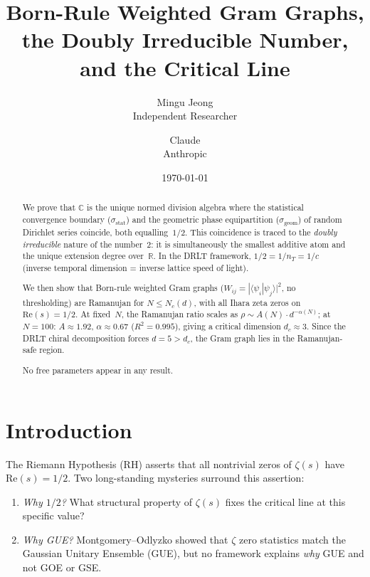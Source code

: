 \documentclass[12pt]{article}
\title{Born-Rule Weighted Gram Graphs,\\
  the Doubly Irreducible Number,\\
  and the Critical Line}
\author{Mingu Jeong\\Independent Researcher
\and Claude\\Anthropic}
\date{\today}
\theoremstyle{definition}
\theoremstyle{remark}
\newcommand{\CC}{\mathbb{C}}
\newcommand{\RR}{\mathbb{R}}
\begin{document}
\maketitle

\begin{abstract}
We prove that $\CC$ is the unique normed division algebra
where the statistical convergence boundary ($\sigma_{\mathrm{stat}}$)
and the geometric phase equipartition ($\sigma_{\mathrm{geom}}$)
of random Dirichlet series coincide, both equalling~$1/2$.
This coincidence is traced to the \emph{doubly irreducible}
nature of the number~2: it is simultaneously the smallest
additive atom and the unique extension degree over~$\RR$.
In the DRLT framework, $1/2 = 1/n_T = 1/c$ (inverse temporal
dimension = inverse lattice speed of light).

We then show that Born-rule weighted Gram graphs
($W_{ij} = |\langle\psi_i|\psi_j\rangle|^2$, no thresholding)
are Ramanujan for $N \leq N_c(d)$, with all Ihara zeta zeros on
$\mathrm{Re}(s) = 1/2$.
At fixed~$N$, the Ramanujan ratio scales as
$\rho \sim A(N) \cdot d^{-\alpha(N)}$;
at $N = 100$: $A \approx 1.92$, $\alpha \approx 0.67$
($R^2 = 0.995$), giving a critical dimension $d_c \approx 3$.
Since the DRLT chiral decomposition forces $d = 5 > d_c$,
the Gram graph lies in the Ramanujan-safe region.

No free parameters appear in any result.
\end{abstract}

\section{Introduction}
\label{sec:intro}

The Riemann Hypothesis (RH) asserts that all nontrivial zeros of
$\zeta(s)$ have $\mathrm{Re}(s) = 1/2$.
Two long-standing mysteries surround this assertion:
\begin{enumerate}[label=(\roman*)]
\item \emph{Why $1/2$?} What structural property of $\zeta(s)$
  fixes the critical line at this specific value?
\item \emph{Why GUE?} Montgomery--Odlyzko showed that $\zeta$ zero
  statistics match the Gaussian Unitary Ensemble (GUE), but no
  framework explains \emph{why} GUE and not GOE or GSE.
\end{enumerate}
\end{document}
